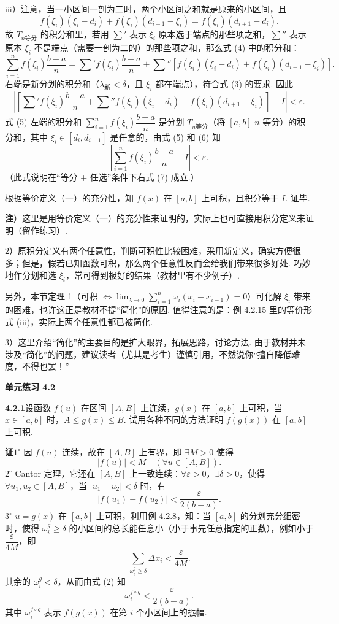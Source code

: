 \documentclass[UTF8, 12pt, fontset=fandol, oneside]{ctexart}
\begin{document}
iii）注意，当一小区间一剖为二时，两个小区间之和就是原来的小区间，且
\[
f(\xi_i)(\xi_i-d_i)+f(\xi_i)(d_{i+1}-\xi_i)=f(\xi_i)(d_{i+1}-d_i).
\]
故 $T_{n\text{等分}}$ 的积分和里，若用 $\sum'$ 表示 $\xi_i$ 原本选于端点的那些项之和，$\sum''$ 表示原本 $\xi_i$ 不是端点（需要一剖为二的）的那些项之和，那么式 (4) 中的积分和：
\[
\sum_{i=1}^n f(\xi_i)\frac{b-a}{n}
=\sum' f(\xi_i)\frac{b-a}{n}
+\sum''[f(\xi_i)(\xi_i-d_i)+f(\xi_i)(d_{i+1}-\xi_i)].
\tag{5}
\]
右端是新分划的积分和（$\lambda_{\text{新}}<\delta$，且 $\xi_i$ 都在端点），符合式 (3) 的要求. 因此
\[
\left|\left[\sum' f(\xi_i)\frac{b-a}{n}
+\sum'' f(\xi_i)(\xi_i-d_i)+f(\xi_i)(d_{i+1}-\xi_i)\right]-I\right|<\varepsilon.
\tag{6}
\]
式 (5) 左端的积分和 $\sum_{i=1}^n f(\xi_i)\dfrac{b-a}{n}$ 是分划 $T_{n\text{等分}}$（将 $[a,b]$ $n$ 等分）的积分和，其中 $\xi_i\in[d_i,d_{i+1}]$ 是任意的，由式 (5) 和 (6) 知
\[
\left|\sum_{i=1}^n f(\xi_i)\frac{b-a}{n}-I\right|<\varepsilon.
\tag{7}
\]
（此式说明在“等分 + 任选”条件下右式 (7) 成立.）

根据等价定义（一）的充分性，知 $f(x)$ 在 $[a,b]$ 上可积，且积分等于 $I$. 证毕.

\noindent\textbf{注}）这里是用等价定义（一）的充分性来证明的，实际上也可直接用积分定义来证明（留作练习）.

2）原积分定义有两个任意性，判断可积性比较困难，采用新定义，确实方便很多；但是，假若已知函数可积，那么两个任意性反而会给我们带来很多好处. 巧妙地作分划和选 $\xi_i$，常可得到极好的结果（教材里有不少例子）.

另外，本节定理 1（可积 $\Leftrightarrow\lim_{\lambda\to0}\sum_{i=1}^n\omega_i(x_i-x_{i-1})=0$）可化解 $\xi_i$ 带来的困难，也许这正是教材不提“简化”的原因. 值得注意的是：例 4.2.15 里的等价形式 (iii)，实际上两个任意性都已被简化.

3）这里介绍“简化”的主要目的是扩大眼界，拓展思路，讨论方法. 由于教材并未涉及“简化”的问题，建议读者（尤其是考生）谨慎引用，不然说你“擅自降低难度，不得也罢！”

\noindent\textbf{单元练习 4.2}

\noindent\textbf{4.2.1}\quad 设函数 $f(u)$ 在区间 $[A,B]$ 上连续，$g(x)$ 在 $[a,b]$ 上可积，当 $x\in[a,b]$ 时，$A\le g(x)\le B$. 试用各种不同的方法证明 $f(g(x))$ 在 $[a,b]$ 上可积.

\noindent\textbf{证}\quad $1^\circ$ 因 $f(u)$ 连续，故在 $[A,B]$ 上有界，即 $\exists M>0$ 使得
\[
|f(u)|<M\quad(\forall u\in[A,B]).
\tag{1}
\]
$2^\circ$ Cantor 定理，它还在 $[A,B]$ 上一致连续：$\forall\varepsilon>0$，$\exists\delta>0$，使得 $\forall u_1,u_2\in[A,B]$，当 $|u_1-u_2|<\delta$ 时，有
\[
|f(u_1)-f(u_2)|<\frac{\varepsilon}{2(b-a)}.
\tag{2}
\]
$3^\circ$ $u=g(x)$ 在 $[a,b]$ 上可积，利用例 4.2.8，知：当 $[a,b]$ 的分划充分细密时，使得 $\omega_i^g\ge\delta$ 的小区间的总长能任意小（小于事先任意指定的正数），例如小于 $\dfrac{\varepsilon}{4M}$，即
\[
\sum_{\omega_i^g\ge\delta}\Delta x_i<\frac{\varepsilon}{4M}.
\tag{3}
\]
其余的 $\omega_i^g<\delta$，从而由式 (2) 知
\[
\omega_i^{f\circ g}<\frac{\varepsilon}{2(b-a)}.
\tag{4}
\]
其中 $\omega_i^{f\circ g}$ 表示 $f(g(x))$ 在第 $i$ 个小区间上的振幅.
\end{document}
